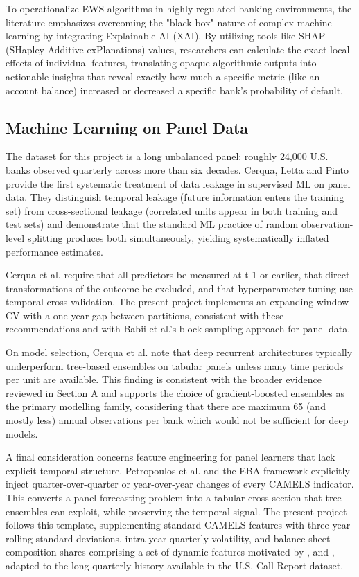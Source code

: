 \documentclass[conference]{IEEEtran}
\begin{document}
To operationalize EWS algorithms in highly regulated banking environments, the literature emphasizes overcoming the "black-box" nature of complex machine learning by integrating Explainable AI (XAI). By utilizing tools like SHAP (SHapley Additive exPlanations) values, researchers can calculate the exact local effects of individual features, translating opaque algorithmic outputs into actionable insights that reveal exactly how much a specific metric (like an account balance) increased or decreased a specific bank's probability of default.

\subsection{Machine Learning on Panel Data}

The dataset for this project is a long unbalanced panel: roughly 24,000 U.S. banks observed quarterly across more than six decades. Cerqua, Letta and Pinto \cite{b5} provide the first systematic treatment of data leakage in supervised ML on panel data. They distinguish temporal leakage (future information enters the training set) from cross-sectional leakage (correlated units appear in both training and test sets) and demonstrate that the standard ML practice of random observation-level splitting produces both simultaneously, yielding systematically inflated performance estimates.

Cerqua et al. \cite{b5} require that all predictors be measured at t-1 or earlier, that direct transformations of the outcome be excluded, and that hyperparameter tuning use temporal cross-validation. The present project implements an expanding-window CV with a one-year gap between partitions, consistent with these recommendations and with Babii et al.'s \cite{b13} block-sampling approach for panel data.

On model selection, Cerqua et al. \cite{b5} note that deep recurrent architectures typically underperform tree-based ensembles on tabular panels unless many time periods per unit are available. This finding is consistent with the broader evidence reviewed in Section A and supports the choice of gradient-boosted ensembles as the primary modelling family, considering that there are maximum 65 (and mostly less) annual observations per bank which would not be sufficient for deep models.

A final consideration concerns feature engineering for panel learners that lack explicit temporal structure. Petropoulos et al. \cite{b4} and the EBA framework \cite{b3} explicitly inject quarter-over-quarter or year-over-year changes of every CAMELS indicator. This converts a panel-forecasting problem into a tabular cross-section that tree ensembles can exploit, while preserving the temporal signal. The present project follows this template, supplementing standard CAMELS features with three-year rolling standard deviations, intra-year quarterly volatility, and balance-sheet composition shares comprising a set of dynamic features motivated by \cite{b2}, \cite{b3} and \cite{b4}, adapted to the long quarterly history available in the U.S. Call Report dataset.
\end{document}
